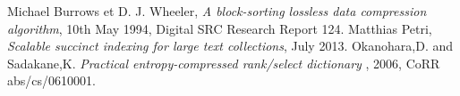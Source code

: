 \begin{thebibliography}{ABC}	
     Michael Burrows et D. J. Wheeler, \emph{A block-sorting lossless data compression algorithm}, 10th May 1994, Digital SRC Research Report 124.
     Matthias Petri, \emph{Scalable succinct indexing for large text collections}, July 2013.
     Okanohara,D. and Sadakane,K. \emph{Practical entropy-compressed rank/select dictionary} , 2006, CoRR abs/cs/0610001.
\end{thebibliography}
